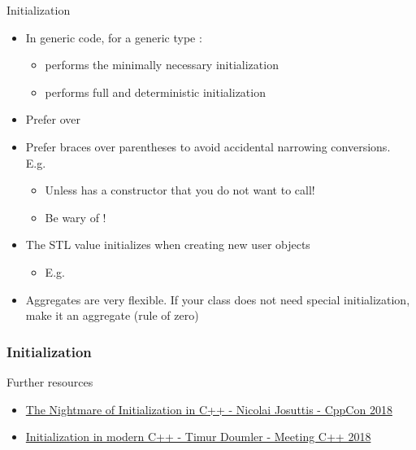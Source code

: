 \begin{frame}[fragile]
  \begin{goodpractice}{Initialization}
    \begin{itemize}
      \item In generic code, for a generic type :
      \begin{itemize}
        \item {} performs the minimally necessary initialization
        \item {} performs full and deterministic initialization
      \end{itemize}
      \item Prefer  over 
      \item Prefer braces over parentheses to avoid accidental narrowing conversions. E.g.\ 
      \begin{itemize}
        \item Unless  has a  constructor that you do not want to call!
        \item Be wary of !
      \end{itemize}
      \item The STL value initializes when creating new user objects
      \begin{itemize}
        \item E.g. 
      \end{itemize}
      \item Aggregates are very flexible. If your class does not need special initialization, make it an aggregate (rule of zero)
    \end{itemize}
  \end{goodpractice}
\end{frame}

\begin{frame}[fragile]
  \frametitle{Initialization}
  \begin{block}{Further resources}
    \begin{itemize}
      \item \href{https://www.youtube.com/watch?v=7DTlWPgX6zs}{The Nightmare of Initialization in C++ - Nicolai Josuttis - CppCon 2018}
      \item \href{https://www.youtube.com/watch?v=ZfP4VAK21zc}{Initialization in modern C++ - Timur Doumler - Meeting C++ 2018}
    \end{itemize}
  \end{block}
\end{frame}
